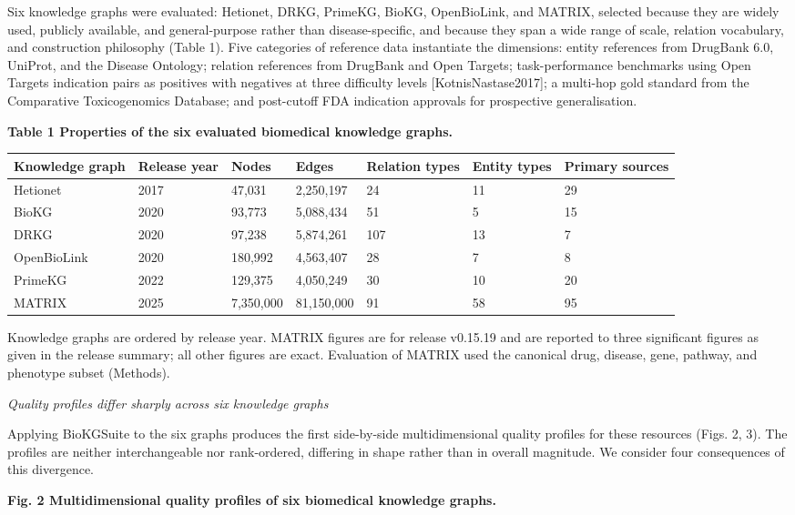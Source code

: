 Six knowledge graphs were evaluated: Hetionet, DRKG, PrimeKG, BioKG, OpenBioLink, and MATRIX, selected because they are widely used, publicly available, and general-purpose rather than disease-specific, and because they span a wide range of scale, relation vocabulary, and construction philosophy (Table 1). Five categories of reference data instantiate the dimensions: entity references from DrugBank 6.0, UniProt, and the Disease Ontology; relation references from DrugBank and Open Targets; task-performance benchmarks using Open Targets indication pairs as positives with negatives at three difficulty levels {[}KotnisNastase2017{]}; a multi-hop gold standard from the Comparative Toxicogenomics Database; and post-cutoff FDA indication approvals for prospective generalisation.

\textbf{Table 1 \textbar{} Properties of the six evaluated biomedical knowledge graphs.}

\begin{longtable}[]{@{}lllllll@{}}
\toprule
\textbf{Knowledge graph} & \textbf{Release year} & \textbf{Nodes} & \textbf{Edges} & \textbf{Relation types} & \textbf{Entity types} & \textbf{Primary sources}\tabularnewline
\midrule
\endhead
Hetionet & 2017 & 47,031 & 2,250,197 & 24 & 11 & 29\tabularnewline
BioKG & 2020 & 93,773 & 5,088,434 & 51 & 5 & 15\tabularnewline
DRKG & 2020 & 97,238 & 5,874,261 & 107 & 13 & 7\tabularnewline
OpenBioLink & 2020 & 180,992 & 4,563,407 & 28 & 7 & 8\tabularnewline
PrimeKG & 2022 & 129,375 & 4,050,249 & 30 & 10 & 20\tabularnewline
MATRIX & 2025 & 7,350,000 & 81,150,000 & 91 & 58 & 95\tabularnewline
\bottomrule
\end{longtable}

Knowledge graphs are ordered by release year. MATRIX figures are for release v0.15.19 and are reported to three significant figures as given in the release summary; all other figures are exact. Evaluation of MATRIX used the canonical drug, disease, gene, pathway, and phenotype subset (Methods).

\emph{Quality profiles differ sharply across six knowledge graphs}

Applying BioKGSuite to the six graphs produces the first side-by-side multidimensional quality profiles for these resources (Figs. 2, 3). The profiles are neither interchangeable nor rank-ordered, differing in shape rather than in overall magnitude. We consider four consequences of this divergence.

\textbf{Fig. 2 \textbar{} Multidimensional quality profiles of six biomedical knowledge graphs.}


